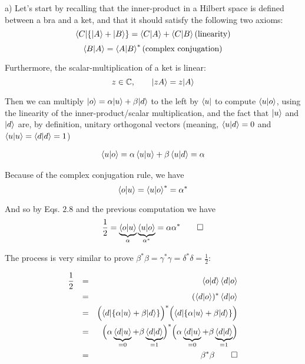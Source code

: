\documentclass[solutions.tex]{subfiles}
\begin{document}
\hrr

a) Let's start by recalling that the inner-product in a Hilbert
space is defined between a bra and a ket, and that it should satisfy
the following two axioms:
\[
	\langle C|\{|A\rangle+|B\rangle\} = \left\langle C \middle| A \right\rangle + \left\langle C \middle| B \right\rangle
	(\text{linearity})
\]
\[
	\left\langle B \middle| A \right\rangle = \left\langle A \middle| B \right\rangle^* (\text{complex conjugation})
\]

Furthermore, the scalar-multiplication of a ket is linear:
\[
	z\in\mathbb{C},\qquad |zA\rangle = z|A\rangle
\]

Then we can multiply $|o\rangle = \alpha|u\rangle + \beta|d\rangle$ to
the left by $\langle u|$ to compute $\left\langle u \middle| o \right\rangle$, using the linearity
of the inner-product/scalar multiplication, and the fact that $|u\rangle$
and $|d\rangle$ are, by definition, unitary orthogonal vectors
(meaning, $\left\langle u \middle| d \right\rangle = 0$ and
$\left\langle u \middle| u \right\rangle=\left\langle d \middle| d \right\rangle = 1$)

\begin{equation*}\begin{aligned}
	\left\langle u \middle| o \right\rangle = \alpha\left\langle u \middle| u \right\rangle +\beta\left\langle u \middle| d \right\rangle = \alpha
\end{aligned}\end{equation*}

Because of the complex conjugation rule, we have
\[
	\left\langle o \middle| u \right\rangle = \left\langle u \middle| o \right\rangle^* = \alpha^*
\]

And so by Eqs. $2.8$ and the previous computation we have
\[
	\frac12 = \underbrace{\left\langle o \middle| u \right\rangle}_\alpha
		\underbrace{\left\langle u \middle| o \right\rangle}_{\alpha^*} = \alpha\alpha^* \qed
\]

The process is very similar to prove $\beta^*\beta = \gamma^*\gamma
= \delta^*\delta = \frac12$:

\begin{equation*}\begin{aligned}
	\frac12 &&=&& \left\langle o \middle| d \right\rangle\left\langle d \middle| o \right\rangle \\
	~ &&=&& (\left\langle d \middle| o \right\rangle)^*\left\langle d \middle| o \right\rangle \\
	~ &&=&& \Bigl(\langle d|\{\alpha|u\rangle + \beta|d\rangle\}\Bigr)^*
		\Bigl(\langle d|\{\alpha|u\rangle + \beta|d\rangle\}\Bigr) \\
	~ &&=&& \Bigl(\alpha\underbrace{\left\langle d \middle| u \right\rangle}_{=0} +
			\beta\underbrace{\left\langle d \middle| d \right\rangle}_{=1}\Bigr)^*
		\Bigl(\alpha\underbrace{\left\langle d \middle| u \right\rangle}_{=0} +
			\beta\underbrace{\left\langle d \middle| d \right\rangle}_{=1}\Bigr) \\
	~ &&=&& \beta^*\beta\qed
\end{aligned}\end{equation*}
\end{document}
